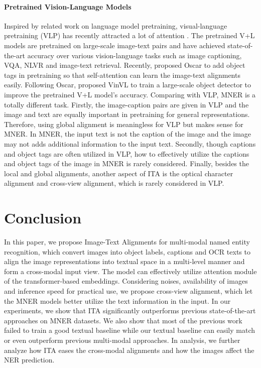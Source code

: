 \documentclass[11pt]{article}
\begin{document}
\paragraph{Pretrained Vision-Language Models}
Inspired by related work on language model pretraining, visual-language pretraining (VLP) has recently attracted a lot of attention \citep{li2019visualbert,Lu2019ViLBERTPT,chen2020uniter,Tan2019LXMERTLC,Li2020OscarOA,Yu2021ERNIEViLKE,zhang2021vinvl}. The pretrained V+L models are pretrained on large-scale image-text pairs and have achieved state-of-the-art accuracy over various vision-language tasks such as image captioning, VQA, NLVR and image-text retrieval. 
Recently, \citet{Li2020OscarOA} proposed Oscar to add object tags in pretraining so that self-attention can learn the image-text alignments easily. Following Oscar, \citet{zhang2021vinvl} proposed VinVL to train a large-scale object detector to improve the pretrained V+L model's accuracy. Comparing with VLP, MNER is a totally different task.
Firstly, the image-caption pairs are given in VLP and the image and text are equally important in pretraining for general representations. Therefore, using global alignment is meaningless for VLP but makes sense for MNER. In MNER, the input text is not the caption of the image and the image may not adds additional information to the input text.
Secondly, though captions and object tags are often utilized in VLP, how to effectively utilize the captions and object tags of the image in MNER is rarely considered. Finally, besides the local and global alignments, another aspect of ITA is the optical character alignment and cross-view alignment, which is rarely considered in VLP. 

\section{Conclusion}
In this paper, we propose Image-Text Alignments for multi-modal named entity recognition, which convert images into object labels, captions and OCR texts to align the image representations into textual space in a multi-level manner and form a cross-modal input view. The model can effectively utilize attention module of the transformer-based embeddings. Considering noises, availability of images and inference speed for practical use, we propose cross-view alignment, which let the MNER models better utilize the text information in the input. In our experiments, we show that ITA significantly outperforms previous state-of-the-art approaches on MNER datasets. We also show that most of the previous work failed to train a good textual baseline while our textual baseline can easily match or even outperform previous multi-modal approaches. In analysis, we further analyze how ITA eases the cross-modal alignments and how the images affect the NER prediction.
\end{document}
